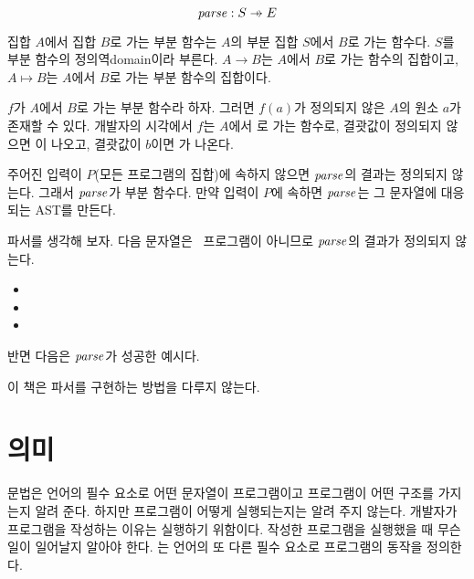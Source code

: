 \[\embox{parse}: S\pto E\]

\begin{kaobox}[frametitle=부분 함수]
  집합 $A$에서 집합 $B$로 가는 부분 함수는 $A$의 부분 집합 $S$에서 $B$로 가는
  함수다. $S$를 부분 함수의 정의역domain이라 부른다. $A\rightarrow B$는 $A$에서
  $B$로 가는 함수의 집합이고, $A\mapsto B$는 $A$에서 $B$로 가는 부분 함수의
  집합이다.

  $f$가 $A$에서 $B$로 가는 부분 함수라 하자. 그러면 $f(a)$가 정의되지 않은 $A$의
  원소 $a$가 존재할 수 있다. 개발자의 시각에서 $f$는 $A$에서
  로 가는 함수로, 결괏값이 정의되지 않으면 이
  나오고, 결괏값이 $b$이면 가 나온다.
\end{kaobox}

주어진 입력이 $P$(모든 프로그램의 집합)에 속하지 않으면 $\mbox{$\mathit{parse}$}$의 결과는
정의되지 않는다. 그래서 $\mbox{$\mathit{parse}$}$가 부분 함수다. 만약 입력이 $P$에 속하면
$\mbox{$\mathit{parse}$}$는 그 문자열에 대응되는 AST를 만든다.

 파서를 생각해 보자. 다음 문자열은 \Lang~프로그램이 아니므로
$\mbox{$\mathit{parse}$}$의 결과가 정의되지 않는다.

\begin{itemize}
  \item {}
  \item {}
  \item {}
\end{itemize}

반면 다음은 $\mbox{$\mathit{parse}$}$가 성공한 예시다.

\begin{center}
\end{center}

이 책은 파서를 구현하는 방법을 다루지 않는다.

\section{의미}

문법은 언어의 필수 요소로 어떤 문자열이 프로그램이고 프로그램이 어떤 구조를
가지는지 알려 준다. 하지만 프로그램이 어떻게 실행되는지는 알려 주지 않는다.
개발자가 프로그램을 작성하는 이유는 실행하기 위함이다. 작성한 프로그램을
실행했을 때 무슨 일이 일어날지 알아야 한다. 는 언어의 또 다른 필수 요소로
프로그램의 동작을 정의한다.

